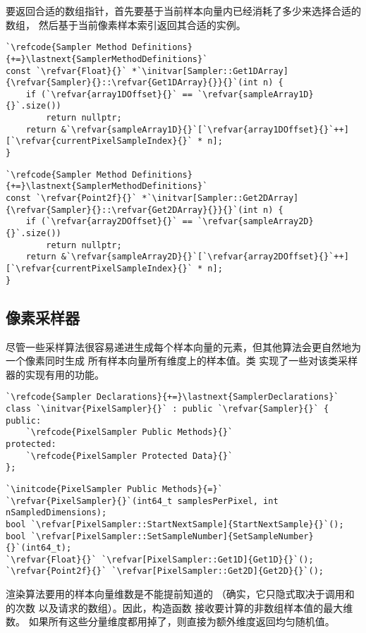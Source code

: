 要返回合适的数组指针，首先要基于当前样本向量内已经消耗了多少来选择合适的数组，
然后基于当前像素样本索引返回其合适的实例。
\begin{lstlisting}
`\refcode{Sampler Method Definitions}{+=}\lastnext{SamplerMethodDefinitions}`
const `\refvar{Float}{}` *`\initvar[Sampler::Get1DArray]{\refvar{Sampler}{}::\refvar{Get1DArray}{}}{}`(int n) {
    if (`\refvar{array1DOffset}{}` == `\refvar{sampleArray1D}{}`.size())
        return nullptr;
    return &`\refvar{sampleArray1D}{}`[`\refvar{array1DOffset}{}`++][`\refvar{currentPixelSampleIndex}{}` * n];
}
\end{lstlisting}
\begin{lstlisting}
`\refcode{Sampler Method Definitions}{+=}\lastnext{SamplerMethodDefinitions}`
const `\refvar{Point2f}{}` *`\initvar[Sampler::Get2DArray]{\refvar{Sampler}{}::\refvar{Get2DArray}{}}{}`(int n) {
    if (`\refvar{array2DOffset}{}` == `\refvar{sampleArray2D}{}`.size())
        return nullptr;
    return &`\refvar{sampleArray2D}{}`[`\refvar{array2DOffset}{}`++][`\refvar{currentPixelSampleIndex}{}` * n];
}
\end{lstlisting}

\subsection{像素采样器}\label{sub:像素采样器}
尽管一些采样算法很容易递进生成每个样本向量的元素，但其他算法会更自然地为一个像素同时生成
所有样本向量所有维度上的样本值。类
实现了一些对该类采样器的实现有用的功能。
\begin{lstlisting}
`\refcode{Sampler Declarations}{+=}\lastnext{SamplerDeclarations}`
class `\initvar{PixelSampler}{}` : public `\refvar{Sampler}{}` {
public:
    `\refcode{PixelSampler Public Methods}{}`
protected:
    `\refcode{PixelSampler Protected Data}{}`
};
\end{lstlisting}
\begin{lstlisting}
`\initcode{PixelSampler Public Methods}{=}`
`\refvar{PixelSampler}{}`(int64_t samplesPerPixel, int nSampledDimensions);
bool `\refvar[PixelSampler::StartNextSample]{StartNextSample}{}`();
bool `\refvar[PixelSampler::SetSampleNumber]{SetSampleNumber}{}`(int64_t);
`\refvar{Float}{}` `\refvar[PixelSampler::Get1D]{Get1D}{}`();
`\refvar{Point2f}{}` `\refvar[PixelSampler::Get2D]{Get2D}{}`();
\end{lstlisting}

渲染算法要用的样本向量维数是不能提前知道的
（确实，它只隐式取决于调用和的次数
以及请求的数组）。因此，构造函数
接收要计算的非数组样本值的最大维数。
如果所有这些分量维度都用掉了，则直接为额外维度返回均匀随机值。

